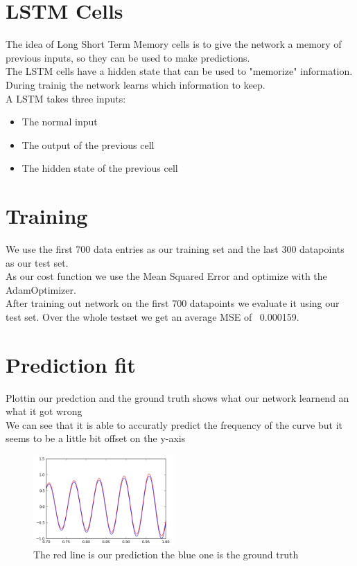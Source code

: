 \documentclass[twoside, twocolumn]{article}
\begin{document}

\section{LSTM Cells}
The idea of Long Short Term Memory cells is to give the network a memory of previous inputs, so they can be used to make predictions. \\
The LSTM cells have a hidden state that can be used to "memorize" information. During trainig the network learns which information to keep. \\
A LSTM takes three inputs:
\begin{itemize} 
\item The normal input
\item The output of the previous cell
\item The hidden state of the previous cell
\end{itemize}


\section{Training}
We use the first 700 data entries as our training set and the last 300 datapoints as our test set. \\
As our cost function we use the Mean Squared Error and optimize with the AdamOptimizer. \\
After training out network on the first 700 datapoints we evaluate it using our test set. Over the whole testset we get an average MSE of ~0.000159.


\section{Prediction fit}
Plottin our predction and the ground truth shows what our network learnend an what it got wrong \\
We can see that it is able to accuratly predict the frequency of the curve but it seems to be a little bit offset on the y-axis

\begin{figure}[htb]
\centering
	\includegraphics[width=0.48\textwidth]{rnn_fit.png}
	\caption{The red line is our prediction the blue one is the ground truth}
\end{figure}
\end{document}
